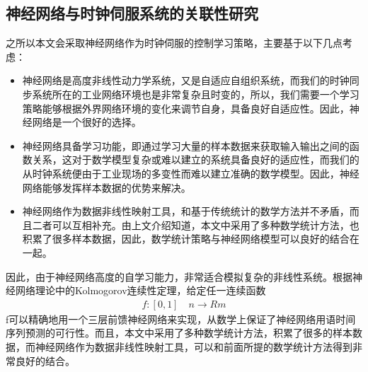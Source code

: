 \subsection{神经网络与时钟伺服系统的关联性研究}
之所以本文会采取神经网络作为时钟伺服的控制学习策略，主要基于以下几点考虑：
\begin{itemize}[noitemsep,topsep=0pt,parsep=0pt,partopsep=0pt]
	\item 神经网络是高度非线性动力学系统，又是自适应自组织系统，而我们的时钟同步系统所在的工业网络环境也是非常复杂且时变的，所以，我们需要一个学习策略能够根据外界网络环境的变化来调节自身，具备良好自适应性。因此，神经网络是一个很好的选择。
	\item 神经网络具备学习功能，即通过学习大量的样本数据来获取输入输出之间的函数关系，这对于数学模型复杂或难以建立的系统具备良好的适应性，而我们的从时钟系统便由于工业现场的多变性而难以建立准确的数学模型。因此，神经网络能够发挥样本数据的优势来解决。
	\item 神经网络作为数据非线性映射工具，和基于传统统计的数学方法并不矛盾，而且二者可以互相补充。由上文介绍知道，本文中采用了多种数学统计方法，也积累了很多样本数据，因此，数学统计策略与神经网络模型可以良好的结合在一起。
\end{itemize}

因此，由于神经网络高度的自学习能力，非常适合模拟复杂的非线性系统。根据神经网络理论中的Kolmogorov连续性定理，给定任一连续函数
\begin{align}
f:[0,1] \quad n \rightarrow Rm
\end{align}
f可以精确地用一个三层前馈神经网络来实现，从数学上保证了神经网络用语时间序列预测的可行性。而且，本文中采用了多种数学统计方法，积累了很多的样本数据，而神经网络作为数据非线性映射工具，可以和前面所提的数学统计方法得到非常良好的结合。

